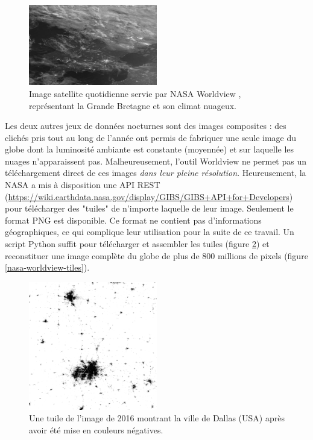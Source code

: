 \documentclass[a4paper, 11pt]{report}
\begin{document}
\begin{figure}[h]
	\centering
	\includegraphics[width=0.5\textwidth]{img/worldview_clouds.JPG}
	\caption{Image satellite quotidienne servie par NASA Worldview \cite{nasa-worldview}, représentant la Grande Bretagne et son climat nuageux.}
	\label{nasa-worldview-daily}
\end{figure}

Les deux autres jeux de données nocturnes sont des images composites : des clichés pris tout au long de l'année ont permis de fabriquer une seule image du globe dont la luminosité ambiante est constante (moyennée) et sur laquelle les nuages n'apparaissent pas. Malheureusement, l'outil Worldview ne permet pas un téléchargement direct de ces images \textit{dans leur pleine résolution}. Heureusement, la NASA a mis à disposition une API REST (\url{https://wiki.earthdata.nasa.gov/display/GIBS/GIBS+API+for+Developers}) pour télécharger des "tuiles" de n'importe laquelle de leur image. Seulement le format PNG est disponible. Ce format ne contient pas d'informations géographiques, ce qui complique leur utilisation pour la suite de ce travail. Un script Python suffit pour télécharger et assembler les tuiles (figure \ref{nasa-worldview-tile}) et reconstituer une image complète du globe de plus de 800 millions de pixels (figure \ref{nasa-worldview-tiles}).

\begin{figure}[h]
	\centering
	\includegraphics[width=0.5\textwidth]{img/018-012.png}
	\caption{Une tuile de l'image de 2016 montrant la ville de Dallas (USA) après avoir été mise en couleurs négatives.}
	\label{nasa-worldview-tile}
\end{figure}
\end{document}
